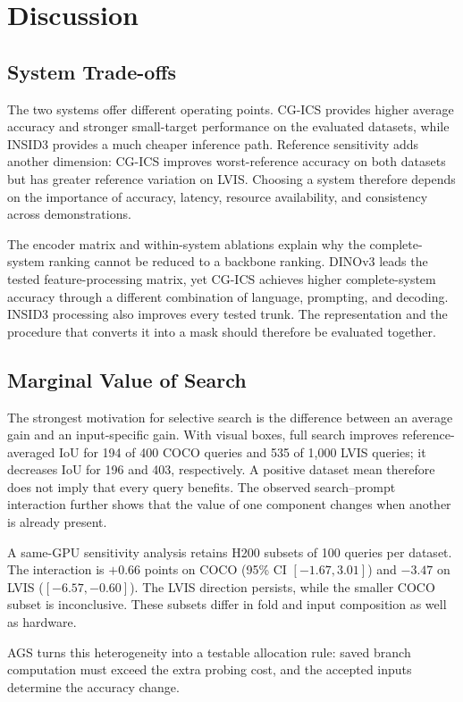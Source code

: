 \section{Discussion}
\subsection{System Trade-offs}
The two systems offer different operating points. CG-ICS provides higher average accuracy and stronger small-target performance on the evaluated datasets, while INSID3 provides a much cheaper inference path. Reference sensitivity adds another dimension: CG-ICS improves worst-reference accuracy on both datasets but has greater reference variation on LVIS. Choosing a system therefore depends on the importance of accuracy, latency, resource availability, and consistency across demonstrations.

The encoder matrix and within-system ablations explain why the complete-system ranking cannot be reduced to a backbone ranking. DINOv3 leads the tested feature-processing matrix, yet CG-ICS achieves higher complete-system accuracy through a different combination of language, prompting, and decoding. INSID3 processing also improves every tested trunk. The representation and the procedure that converts it into a mask should therefore be evaluated together.

\subsection{Marginal Value of Search}
The strongest motivation for selective search is the difference between an average gain and an input-specific gain. With visual boxes, full search improves reference-averaged IoU for 194 of 400 COCO queries and 535 of 1,000 LVIS queries; it decreases IoU for 196 and 403, respectively. A positive dataset mean therefore does not imply that every query benefits. The observed search--prompt interaction further shows that the value of one component changes when another is already present.

A same-GPU sensitivity analysis retains H200 subsets of 100 queries per dataset. The interaction is $+0.66$ points on COCO (95\% CI $[-1.67,3.01]$) and $-3.47$ on LVIS ($[-6.57,-0.60]$). The LVIS direction persists, while the smaller COCO subset is inconclusive. These subsets differ in fold and input composition as well as hardware.

AGS turns this heterogeneity into a testable allocation rule: saved branch computation must exceed the extra probing cost, and the accepted inputs determine the accuracy change.

